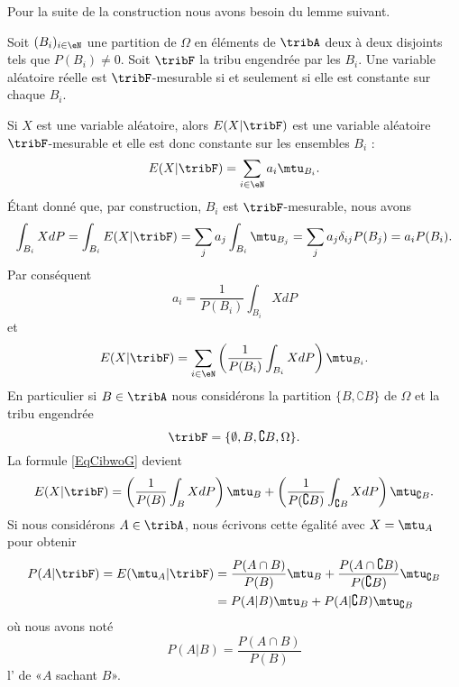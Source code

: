 Pour la suite de la construction nous avons besoin du lemme suivant.
\begin{lemma}
    Soit \( (B_i)_{i\in\eN}\) une partition de \( \Omega\) en éléments de \( \tribA\) deux à deux disjoints tels que \( P(B_i)\neq 0\). Soit \( \tribF\) la tribu engendrée par les \( B_i\). Une variable aléatoire réelle est \( \tribF\)-mesurable si et seulement si elle est constante sur chaque \( B_i\).
\end{lemma}

Si \( X\) est une variable aléatoire, alors \( E(X|\tribF)\) est une variable aléatoire \( \tribF\)-mesurable et elle est donc constante sur les ensembles \( B_i\) :
\begin{equation}
    E(X|\tribF)=\sum_{i\in\eN}a_i\mtu_{B_i}.
\end{equation}
Étant donné que, par construction, \( B_i\) est \( \tribF\)-mesurable, nous avons 
\begin{equation}
        \int_{B_i}XdP=\int_{B_i}E(X|\tribF)
        =\sum_ja_j\int_{B_i}\mtu_{B_j}
        =\sum_ja_j\delta_{ij}P(B_j)
        =a_iP(B_i).
\end{equation}
Par conséquent
\begin{equation}
    a_i=\frac{1}{ P(B_i) }\int_{B_i}XdP
\end{equation}
et
\begin{equation}    \label{EqCibwoG}
    E(X|\tribF)=\sum_{i\in \eN}\left( \frac{1}{ P(B_i) }\int_{B_i}XdP \right)\mtu_{B_i}.
\end{equation}
En particulier si \( B\in \tribA\) nous considérons la partition \( \{ B,\complement B \}\) de \( \Omega\) et la tribu engendrée
\begin{equation}
    \tribF=\{ \emptyset,B,\complement B,\Omega \}.
\end{equation}
La formule \eqref{EqCibwoG} devient
\begin{equation}
    E(X|\tribF)=\left( \frac{1}{ P(B) }\int_BXdP \right)\mtu_B+\left( \frac{1}{ P(\complement B) }\int_{\complement B}XdP \right)\mtu_{\complement B}.
\end{equation}
Si nous considérons \( A\in\tribA\), nous écrivons cette égalité avec \( X=\mtu_A\) pour obtenir
\begin{subequations}
    \begin{align}
        P(A|\tribF)=E(\mtu_A|\tribF)&=\frac{ P(A\cap B) }{ P(B) }\mtu_B+\frac{ P(A\cap\complement B) }{ P(\complement B) }\mtu_{\complement B}\\
        &=P(A|B)\mtu_B+P(A|\complement B)\mtu_{\complement B}
    \end{align}
\end{subequations}
où nous avons noté
\begin{equation}
    P(A|B)=\frac{ P(A\cap B) }{ P(B) }
\end{equation}
l' de «\( A\) sachant \( B\)».

